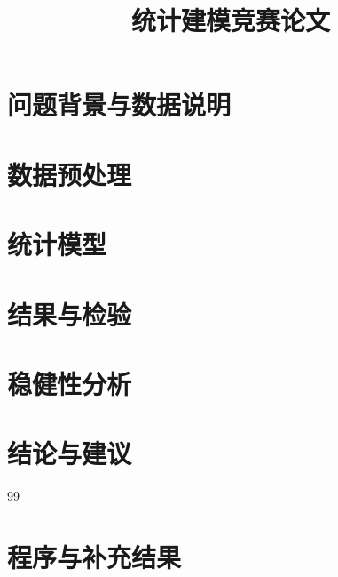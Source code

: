 \documentclass[UTF8,12pt,a4paper]{ctexart}
\title{统计建模竞赛论文}
\author{}
\date{}
\begin{document}
\maketitle
\begin{abstract}
\end{abstract}
\tableofcontents
\section{问题背景与数据说明}
\section{数据预处理}
\section{统计模型}
\section{结果与检验}
\section{稳健性分析}
\section{结论与建议}
\begin{thebibliography}{99}
\end{thebibliography}
\appendix
\section{程序与补充结果}
\end{document}
